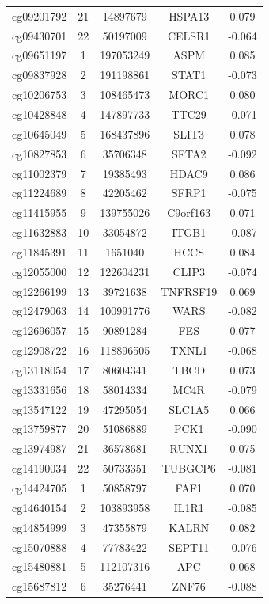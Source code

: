 \documentclass[12pt,a4paper]{article}
\begin{document}
\begin{longtable}{|c|c|c|c|c|}
		cg09201792 & 21 & 14897679 & HSPA13 & 0.079 \\
		cg09430701 & 22 & 50197009 & CELSR1 & -0.064 \\
		cg09651197 & 1 & 197053249 & ASPM & 0.085 \\
		cg09837928 & 2 & 191198861 & STAT1 & -0.073 \\
		cg10206753 & 3 & 108465473 & MORC1 & 0.080 \\
		cg10428848 & 4 & 147897733 & TTC29 & -0.071 \\
		cg10645049 & 5 & 168437896 & SLIT3 & 0.078 \\
		cg10827853 & 6 & 35706348 & SFTA2 & -0.092 \\
		cg11002379 & 7 & 19385493 & HDAC9 & 0.086 \\
		cg11224689 & 8 & 42205462 & SFRP1 & -0.075 \\
		cg11415955 & 9 & 139755026 & C9orf163 & 0.071 \\
		cg11632883 & 10 & 33054872 & ITGB1 & -0.087 \\
		cg11845391 & 11 & 1651040 & HCCS & 0.084 \\
		cg12055000 & 12 & 122604231 & CLIP3 & -0.074 \\
		cg12266199 & 13 & 39721638 & TNFRSF19 & 0.069 \\
		cg12479063 & 14 & 100991776 & WARS & -0.082 \\
		cg12696057 & 15 & 90891284 & FES & 0.077 \\
		cg12908722 & 16 & 118896505 & TXNL1 & -0.068 \\
		cg13118054 & 17 & 80604341 & TBCD & 0.073 \\
		cg13331656 & 18 & 58014334 & MC4R & -0.079 \\
		cg13547122 & 19 & 47295054 & SLC1A5 & 0.066 \\
		cg13759877 & 20 & 51086889 & PCK1 & -0.090 \\
		cg13974987 & 21 & 36578681 & RUNX1 & 0.075 \\
		cg14190034 & 22 & 50733351 & TUBGCP6 & -0.081 \\
		cg14424705 & 1 & 50858797 & FAF1 & 0.070 \\
		cg14640154 & 2 & 103893958 & IL1R1 & -0.085 \\
		cg14854999 & 3 & 47355879 & KALRN & 0.082 \\
		cg15070888 & 4 & 77783422 & SEPT11 & -0.076 \\
		cg15480881 & 5 & 112107316 & APC & 0.068 \\
		cg15687812 & 6 & 35276441 & ZNF76 & -0.088 \\

\end{longtable}
\end{document}
